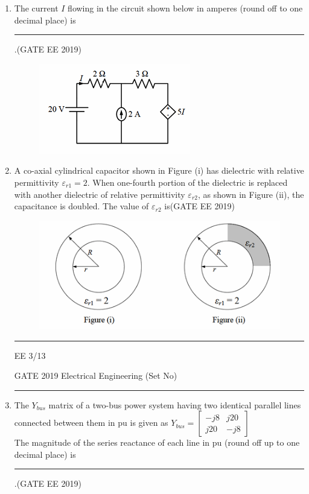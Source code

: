 \documentclass[a4paper,10pt]{exam}
\theoremstyle{remark}
\begin{document}
\begin{enumerate}
\begin{enumerate}[label=\arabic*.]
\item The current $I$ flowing in the circuit shown below in amperes (round off to one decimal place) is  \rule{2cm}{0.15mm}.\hfill{(GATE EE 2019)}
\begin{figure}[H]
    \centering
    \includegraphics[width=0.5\columnwidth]{figs/Q 19.png}\caption{}     \label{fig:placeholder}
\end{figure}

\item A co-axial cylindrical capacitor shown in Figure (i) has dielectric with relative permittivity $\varepsilon_{r1} = 2$. When one-fourth portion of the dielectric is replaced with another dielectric of relative permittivity $\varepsilon_{r2}$, as shown in Figure (ii), the capacitance is doubled. The value of $\varepsilon_{r2}$ is\hfill{(GATE EE 2019)}
\begin{figure}[H]
    \centering
    \includegraphics[width=0.75\columnwidth]{figs/Q 20.png}\caption{}     \label{fig:placeholder}
\end{figure}
\vfill
\noindent\rule{\linewidth}{0.4pt}
EE \hfill 3/13
\newpage
\raggedright{GATE 2019 Electrical Engineering (Set No)}
\noindent\rule{\linewidth}{0.4pt}
\item The $Y_{bus}$ matrix of a two-bus power system having two identical parallel lines connected between them in pu is given as
$
Y_{bus} =  \begin{bmatrix}
-j8 & j20 \\
j20 & -j8
\end{bmatrix}
$\\
The magnitude of the series reactance of each line in pu (round off up to one decimal place) is \rule{2cm}{0.15mm} .\hfill{(GATE EE 2019)}
\vspace{0.4cm}


\end{enumerate}
\end{enumerate}
\end{document}
